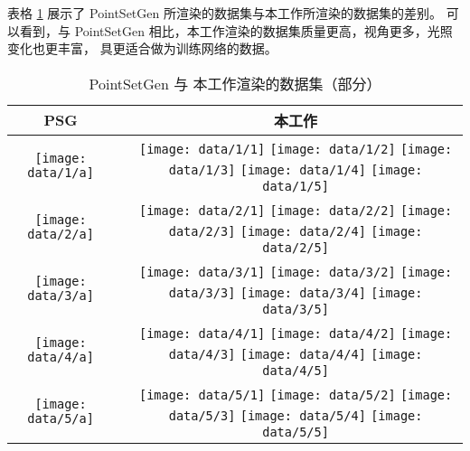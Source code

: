 表格 \ref{tab:render} 展示了 PointSetGen 所渲染的数据集与本工作所渲染的数据集的差别。
可以看到，与 PointSetGen 相比，本工作渲染的数据集质量更高，视角更多，光照变化也更丰富，
具更适合做为训练网络的数据。

\begin{table}[htb]
	\centering
	\caption{PointSetGen\cite{pointsetgen} 与 本工作渲染的数据集（部分）\label{tab:render}}
	\begin{tabularx}{\linewidth}{ccc}
		\toprule[1.5pt]
		{\heiti PSG\cite{pointsetgen}}                     &  & {\heiti 本工作}
		\\\midrule[1pt]
		{\texttt{[image: data/1/a]}} &  &
		{\texttt{[image: data/1/1]}}
			{\texttt{[image: data/1/2]}}
			{\texttt{[image: data/1/3]}}
			{\texttt{[image: data/1/4]}}
			{\texttt{[image: data/1/5]}}
		\\
		{\texttt{[image: data/2/a]}} &  &
		{\texttt{[image: data/2/1]}}
			{\texttt{[image: data/2/2]}}
			{\texttt{[image: data/2/3]}}
			{\texttt{[image: data/2/4]}}
			{\texttt{[image: data/2/5]}}
		\\
		{\texttt{[image: data/3/a]}} &  &
		{\texttt{[image: data/3/1]}}
			{\texttt{[image: data/3/2]}}
			{\texttt{[image: data/3/3]}}
			{\texttt{[image: data/3/4]}}
			{\texttt{[image: data/3/5]}}
		\\
		{\texttt{[image: data/4/a]}} &  &
		{\texttt{[image: data/4/1]}}
			{\texttt{[image: data/4/2]}}
			{\texttt{[image: data/4/3]}}
			{\texttt{[image: data/4/4]}}
			{\texttt{[image: data/4/5]}}
		\\
		{\texttt{[image: data/5/a]}} &  &
		{\texttt{[image: data/5/1]}}
			{\texttt{[image: data/5/2]}}
			{\texttt{[image: data/5/3]}}
			{\texttt{[image: data/5/4]}}
			{\texttt{[image: data/5/5]}}
		\\
		\bottomrule[1.5pt]
	\end{tabularx}
\end{table}


